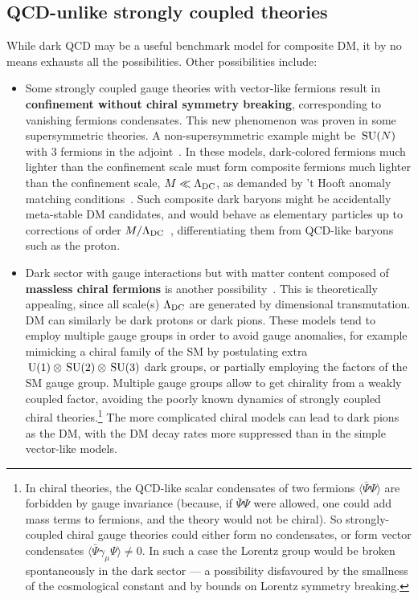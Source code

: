 \subsection{QCD-unlike strongly coupled theories}
While dark QCD may be a useful benchmark model for composite DM, it by no means exhausts all the possibilities. 
Other possibilities include:
\begin{itemize}
\item[\scalebox{0.6}{$\blacksquare$}] 
Some strongly coupled gauge theories with vector-like fermions result in
{\bf confinement without chiral symmetry breaking}, corresponding to vanishing fermions condensates.
This new phenomenon was proven in some supersymmetric theories.
A non-supersymmetric example might be $\,{\rm SU}(N)$ with 3 fermions in the adjoint~\cite{anomaly:matching}.
In these models, dark-colored fermions much lighter than the confinement scale must
form composite fermions much lighter than the confinement scale, $M \ll \Lambda_{\rm DC}$, 
as demanded by 't Hooft anomaly matching conditions~\cite{anomaly:matching}.
Such composite dark baryons might be accidentally meta-stable DM candidates, and would behave as 
elementary particles up to corrections of order $M/\Lambda_{\rm DC}$~\cite{anomaly:matching},
differentiating them from QCD-like baryons such as the proton.


\item[\scalebox{0.6}{$\blacksquare$}]

Dark sector with gauge interactions but with matter content composed of {\bf massless chiral fermions} is another possibility~\cite{ChiralCompositeDM}.
This is theoretically appealing, since all scale(s)
$\Lambda_{\rm DC}$ are generated by dimensional transmutation.
DM can similarly be dark protons or dark pions.
These models tend to employ multiple gauge groups in order to avoid gauge anomalies,
for example mimicking a chiral family of the SM by postulating extra $\,{\rm U}(1)\otimes \,{\rm SU}(2)\otimes\,{\rm SU}(3)$ dark groups,
or partially employing the factors of the SM gauge group.
Multiple gauge groups allow to get chirality from a weakly coupled factor, 
avoiding the poorly known dynamics of strongly coupled chiral theories.\footnote{In chiral theories, the QCD-like scalar condensates of two fermions $\langle \bar\Psi\Psi\rangle$
are forbidden by gauge invariance
(because, if $\bar\Psi \Psi$ were allowed, one could add mass terms to fermions, and the theory would not be chiral).
So strongly-coupled chiral gauge theories could either form no condensates,
or form vector condensates $\langle \bar\Psi\gamma_\mu\Psi \rangle\ne 0$.
In such a case  the Lorentz group would be broken spontaneously in the dark sector ---
a possibility disfavoured by the smallness of the cosmological constant and by bounds on Lorentz symmetry breaking.}
The more complicated chiral models can lead to dark pions as the DM, with the DM decay rates more suppressed
than in the simple vector-like models.


\end{itemize}
